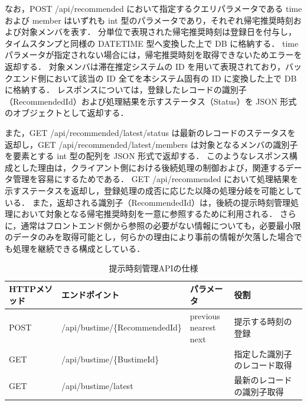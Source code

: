 なお，POST /api/recommended において指定するクエリパラメータである time および member はいずれも int 型のパラメータであり，それぞれ帰宅推奨時刻および対象メンバを表す．
分単位で表現された帰宅推奨時刻は登録日を付与し，タイムスタンプと同様の DATETIME 型へ変換した上で DB に格納する．
time パラメータが指定されない場合には，帰宅推奨時刻を取得できないためエラーを返却する．
対象メンバは滞在推定システムの ID を用いて表現されており，バックエンド側において該当の ID 全てを本システム固有の ID に変換した上で DB に格納する．
レスポンスについては，登録したレコードの識別子（RecommendedId）および処理結果を示すステータス（Status）を JSON 形式のオブジェクトとして返却する．


また，GET /api/recommended/latest/status は最新のレコードのステータスを返却し，GET /api/recommended/latest/members は対象となるメンバの識別子を要素とする int 型の配列を JSON 形式で返却する．
このようなレスポンス構成とした理由は，クライアント側における後続処理の制御および，関連するデータ管理を容易にするためである．
GET /api/recommended において処理結果を示すステータスを返却し，登録処理の成否に応じた以降の処理分岐を可能としている．
また，返却される識別子（RecommendedId）は，後続の提示時刻管理処理において対象となる帰宅推奨時刻を一意に参照するために利用される．
さらに，通常はフロントエンド側から参照の必要がない情報についても，必要最小限のデータのみを取得可能とし，何らかの理由により事前の情報が欠落した場合でも処理を継続できる構成としている．


\begin{table}[htb]
  \captionsetup[table]{justification=centering}
  \centering
  \caption{提示時刻管理APIの仕様}
  \label{tab:bustimeAPI}
  \begin{tabular}{|
    >{\centering\arraybackslash}m{1.5cm}|
    >{\raggedright\arraybackslash}m{6cm}|
    >{\centering\arraybackslash}m{2cm}|
    >{\centering\arraybackslash}m{3cm}|}
    \hline
    \textbf{HTTPメソッド} & \textbf{エンドポイント}               & \textbf{パラメータ} & \textbf{役割} \\
    \hline
    POST
                      & /api/bustime/\{RecommendedId\}
                      & \makecell[c]{previous                                         \\nearest\\next}
                      & 提示する時刻の登録                                                     \\
    \hline
    GET
                      & /api/bustime/\{BustimeId\}
                      &
                      & 指定した識別子のレコード取得                                                \\
    \hline
    GET
                      & /api/bustime/latest
                      &
                      & 最新のレコードの識別子取得                                                 \\
    \hline
  \end{tabular}
\end{table}

